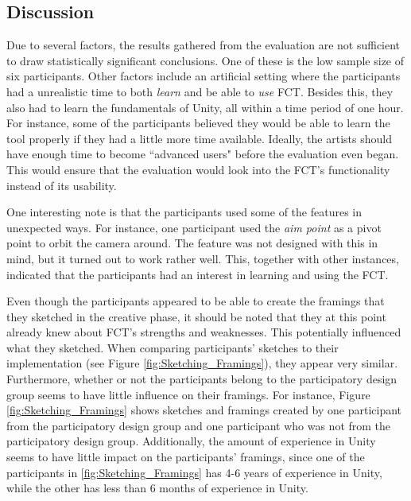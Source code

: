 \subsection{Discussion}


Due to several factors, the results gathered from the evaluation are not sufficient to draw statistically significant conclusions. One of these is the low sample size of six participants. Other factors include an artificial setting where the participants had a unrealistic time to both \textit{learn} and be able to \textit{use} FCT. Besides this, they also had to learn the fundamentals of Unity, all within a time period of one hour. For instance, some of the participants believed they would be able to learn the tool properly if they had a little more time available. Ideally, the artists should have enough time to become ``advanced users" before the evaluation even began. This would ensure that the evaluation would look into the FCT's functionality instead of its usability.

One interesting note is that the participants used some of the features in unexpected ways. For instance, one participant used the \textit{aim point} as a pivot point to orbit the camera around. The feature was not designed with this in mind, but it turned out to work rather well. This, together with other instances, indicated that the participants had an interest in learning and using the FCT.

Even though the participants appeared to be able to create the framings that they sketched in the creative phase, it should be noted that they at this point already knew about FCT's strengths and weaknesses. This potentially influenced what they sketched.
When comparing participants' sketches to their implementation (see Figure \ref{fig:Sketching_Framings}), they appear very similar. 
Furthermore, whether or not the participants belong to the participatory design group seems to have little influence on their framings. For instance, Figure \ref{fig:Sketching_Framings} shows sketches and framings created by one participant from the participatory design group and one participant who was not from the participatory design group.
Additionally, the amount of experience in Unity seems to have little impact on the participants' framings, since one of the participants in \ref{fig:Sketching_Framings} has 4-6 years of experience in Unity, while the other has less than 6 months of experience in Unity.

